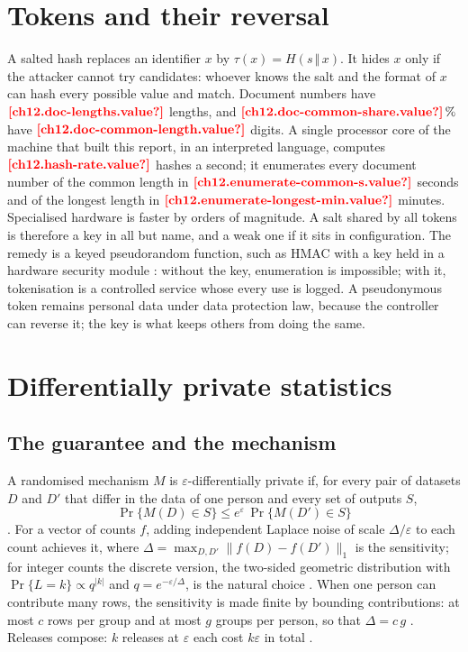 \section{Tokens and their reversal}\label{sec:gp-tokens}

A salted hash replaces an identifier $x$ by $\tau(x) = H(s \,\Vert\, x)$. It hides $x$ only if the attacker cannot try
candidates: whoever knows the salt and the format of $x$ can hash every possible value and match. Document numbers have
$\est{ch12.doc-lengths}{value}$ lengths, and $\est{ch12.doc-common-share}{value}\,\%$ have $\est{ch12.doc-common-length}{value}$
digits. A single processor core of the machine that built this report, in an interpreted language, computes
$\est{ch12.hash-rate}{value}$ hashes a second; it enumerates every document number of the common length in
$\est{ch12.enumerate-common-s}{value}$ seconds and of the longest length in $\est{ch12.enumerate-longest-min}{value}$ minutes.
Specialised hardware is faster by orders of magnitude. A salt shared by all tokens is therefore a key in all but name, and
a weak one if it sits in configuration. The remedy is a keyed pseudorandom function, such as HMAC with a key held in a
hardware security module \autocite{bellare1996,krawczyk1997}: without the key, enumeration is impossible; with it,
tokenisation is a controlled service whose every use is logged. A pseudonymous token remains personal data under data
protection law, because the controller can reverse it; the key is what keeps others from doing the same.

\section{Differentially private statistics}\label{sec:gp-dp}

\subsection{The guarantee and the mechanism}

A randomised mechanism $M$ is $\varepsilon$-differentially private if, for every pair of datasets $D$ and $D'$ that
differ in the data of one person and every set of outputs $S$,
\begin{equation}\label{eq:gp-dp}
  \Pr\{M(D) \in S\} \le e^{\varepsilon}\, \Pr\{M(D') \in S\}
\end{equation}
\autocite{dwork2006}. For a vector of counts $f$, adding independent Laplace noise of scale $\Delta / \varepsilon$ to each
count achieves it, where $\Delta = \max_{D, D'} \lVert f(D) - f(D') \rVert_1$ is the sensitivity; for integer counts the
discrete version, the two-sided geometric distribution with $\Pr\{L = k\} \propto q^{\lvert k \rvert}$ and
$q = e^{-\varepsilon / \Delta}$, is the natural choice \autocite{ghosh2012}. When one person can contribute many rows,
the sensitivity is made finite by bounding contributions: at most $c$ rows per group and at most $g$ groups per person,
so that $\Delta = c\,g$ \autocite{wilson2020}. Releases compose: $k$ releases at $\varepsilon$ each cost $k\varepsilon$
in total \autocite{dwork2014}.

